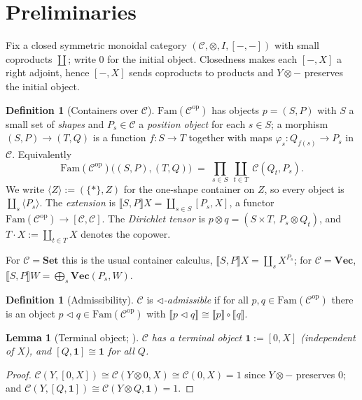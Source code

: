 \documentclass[11pt]{amsart}
\theoremstyle{plain}
\newtheorem{lemma}[theorem]{Lemma}
\theoremstyle{definition}
\newtheorem{definition}[theorem]{Definition}
\newcommand{\C}{\mathcal{C}}
\newcommand{\Fam}{\mathrm{Fam}}
\newcommand{\ext}[1]{\llbracket #1 \rrbracket}
\newcommand{\Setb}{\mathbf{Set}}
\newcommand{\Vecb}{\mathbf{Vec}}
\newcommand{\op}{\mathrm{op}}
\newcommand{\comp}{\mathbin{\triangleleft}}
\newcommand{\one}{\mathbf{1}}
\newcommand{\gena}[1]{\langle #1 \rangle}
\begin{document}
\section{Preliminaries}\label{sec:prelim}

Fix a closed symmetric monoidal category $(\C,\otimes,I,[-,-])$ with small coproducts $\coprod$;
write $0$ for the initial object. Closedness makes each $[-,X]$ a right adjoint, hence
$[-,X]$ sends coproducts to products and $Y\otimes-$ preserves the initial object.

\begin{definition}[Containers over $\C$]
$\Fam(\C^{\op})$ has objects $p=(S,P)$ with $S$ a small set of \emph{shapes} and $P_s\in\C$ a
\emph{position object} for each $s\in S$; a morphism $(S,P)\to(T,Q)$ is a function $f:S\to T$
together with maps $\varphi_s:Q_{f(s)}\to P_s$ in $\C$. Equivalently
\begin{equation}\label{eq:hom}
   \Fam(\C^{\op})\big((S,P),(T,Q)\big)\;=\;\prod_{s\in S}\ \coprod_{t\in T}\ \C(Q_t,P_s).
\end{equation}
We write $\gena{Z}:=(\{*\},Z)$ for the one-shape container on $Z$, so every object is
$\coprod_{s}\gena{P_s}$. The \emph{extension} is $\ext{S,P}X=\coprod_{s\in S}[P_s,X]$, a functor
$\Fam(\C^{\op})\to[\C,\C]$. The \emph{Dirichlet tensor} is $p\otimes q=(S\times T,\,P_s\otimes Q_t)$,
and $T\cdot X:=\coprod_{t\in T}X$ denotes the copower.
\end{definition}

For $\C=\Setb$ this is the usual container calculus, $\ext{S,P}X=\coprod_s X^{P_s}$; for $\C=\Vecb$,
$\ext{S,P}W=\bigoplus_s\Vecb(P_s,W)$.

\begin{definition}[Admissibility]\label{def:admissible}
$\C$ is \emph{$\comp$-admissible} if for all $p,q\in\Fam(\C^{\op})$ there is an object
$p\comp q\in\Fam(\C^{\op})$ with $\ext{p\comp q}\cong\ext p\circ\ext q$.
\end{definition}

\begin{lemma}[Terminal object; {\cite[Lemma~1.0]{proofconv}}]\label{lem:terminal}
$\C$ has a terminal object $\one:=[0,X]$ (independent of $X$), and $[Q,\one]\cong\one$ for all $Q$.
\end{lemma}
\begin{proof}
$\C(Y,[0,X])\cong\C(Y\otimes 0,X)\cong\C(0,X)=1$ since $Y\otimes-$ preserves $0$; and
$\C(Y,[Q,\one])\cong\C(Y\otimes Q,\one)=1$.
\end{proof}
\end{document}
